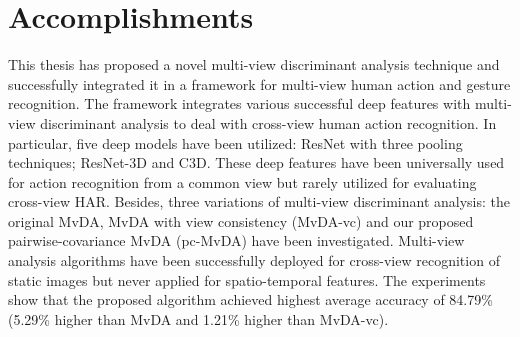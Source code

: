 
\section{Accomplishments}
    This thesis has proposed a novel multi-view discriminant analysis technique and successfully integrated it in a framework for multi-view human action and gesture recognition.
    The framework integrates various successful deep features with multi-view discriminant analysis to deal with cross-view human action recognition.
    In particular, five deep models have been utilized: ResNet with three pooling techniques; ResNet-3D and C3D.
    These deep features have been universally used for action recognition from a common view but rarely utilized for evaluating cross-view HAR.
    Besides, three variations of multi-view discriminant analysis: the original MvDA, MvDA with view consistency (MvDA-vc) and our proposed pairwise-covariance MvDA (pc-MvDA) have been investigated.
    Multi-view analysis algorithms have been successfully deployed for cross-view recognition of static images but never applied for spatio-temporal features.
    The experiments show that the proposed algorithm achieved highest average accuracy of 84.79\% (5.29\% higher than MvDA and 1.21\% higher than MvDA-vc).
